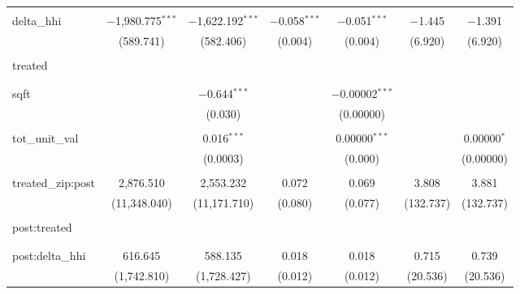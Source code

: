 \begin{table}[H]
{\begin{tabular}{@{\extracolsep{5pt}}lcccccc}
   & & & & & & \\  

  delta\_hhi & $-$1,980.775$^{***}$ & $-$1,622.192$^{***}$ & $-$0.058$^{***}$ & $-$0.051$^{***}$ & $-$1.445 & $-$1.391 \\  

   & (589.741) & (582.406) & (0.004) & (0.004) & (6.920) & (6.920) \\  

   & & & & & & \\  

  treated &  &  &  &  &  &  \\  

   &  &  &  &  &  &  \\  

   & & & & & & \\  

  sqft &  & $-$0.644$^{***}$ &  & $-$0.00002$^{***}$ &  &  \\  

   &  & (0.030) &  & (0.00000) &  &  \\  

   & & & & & & \\  

  tot\_unit\_val &  & 0.016$^{***}$ &  & 0.00000$^{***}$ &  & 0.00000$^{*}$ \\  

   &  & (0.0003) &  & (0.000) &  & (0.00000) \\  

   & & & & & & \\  

  treated\_zip:post & 2,876.510 & 2,553.232 & 0.072 & 0.069 & 3.808 & 3.881 \\  

   & (11,348.040) & (11,171.710) & (0.080) & (0.077) & (132.737) & (132.737) \\  

   & & & & & & \\  

  post:treated &  &  &  &  &  &  \\  

   &  &  &  &  &  &  \\  

   & & & & & & \\  

  post:delta\_hhi & 616.645 & 588.135 & 0.018 & 0.018 & 0.715 & 0.739 \\  

   & (1,742.810) & (1,728.427) & (0.012) & (0.012) & (20.536) & (20.536) \\  


\end{tabular}}
\end{table}
